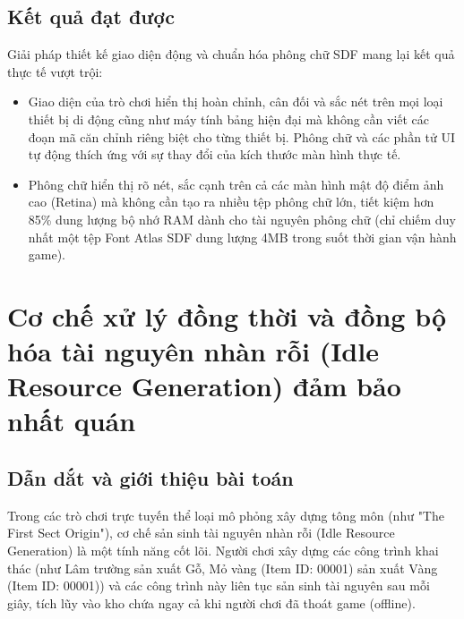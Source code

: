 \documentclass[../Project.tex]{subfiles}
\begin{document}
\subsection{Kết quả đạt được}
Giải pháp thiết kế giao diện động và chuẩn hóa phông chữ SDF mang lại kết quả thực tế vượt trội:
\begin{itemize}
    \item Giao diện của trò chơi hiển thị hoàn chỉnh, cân đối và sắc nét trên mọi loại thiết bị di động cũng như máy tính bảng hiện đại mà không cần viết các đoạn mã căn chỉnh riêng biệt cho từng thiết bị. Phông chữ và các phần tử UI tự động thích ứng với sự thay đổi của kích thước màn hình thực tế.
    \item Phông chữ hiển thị rõ nét, sắc cạnh trên cả các màn hình mật độ điểm ảnh cao (Retina) mà không cần tạo ra nhiều tệp phông chữ lớn, tiết kiệm hơn 85\% dung lượng bộ nhớ RAM dành cho tài nguyên phông chữ (chỉ chiếm duy nhất một tệp Font Atlas SDF dung lượng 4MB trong suốt thời gian vận hành game).
\end{itemize}

\section{Cơ chế xử lý đồng thời và đồng bộ hóa tài nguyên nhàn rỗi (Idle Resource Generation) đảm bảo nhất quán}
\label{sec:sol_idle_resource}

\subsection{Dẫn dắt và giới thiệu bài toán}
Trong các trò chơi trực tuyến thể loại mô phỏng xây dựng tông môn (như "The First Sect Origin"), cơ chế sản sinh tài nguyên nhàn rỗi (Idle Resource Generation) là một tính năng cốt lõi. Người chơi xây dựng các công trình khai thác (như Lâm trường sản xuất Gỗ, Mỏ vàng (Item ID: 00001) sản xuất Vàng (Item ID: 00001)) và các công trình này liên tục sản sinh tài nguyên sau mỗi giây, tích lũy vào kho chứa ngay cả khi người chơi đã thoát game (offline).
\end{document}
